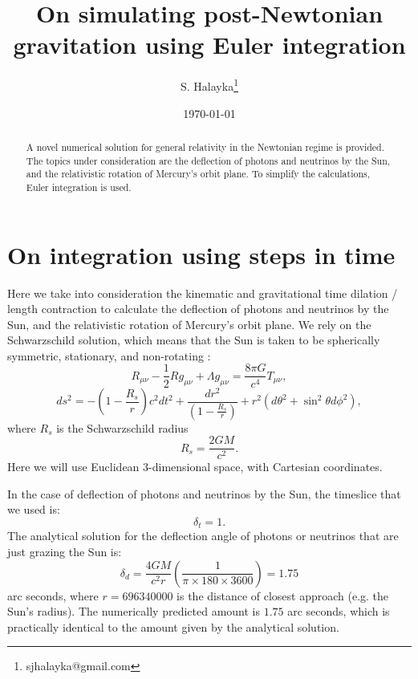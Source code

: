 \documentclass[12pt]{article}
\title{On simulating post-Newtonian gravitation using Euler integration}
\author{S. Halayka\footnote{sjhalayka@gmail.com}}
\date{\today\;\currenttime}
\begin{document}
 
\maketitle

\begin{abstract}
A novel numerical solution for general relativity in the Newtonian regime is provided.
The topics under consideration are the deflection of photons and neutrinos by the Sun, and the relativistic rotation of Mercury's orbit plane.
To simplify the calculations, Euler integration is used.
\end{abstract}





\section{On integration using steps in time}

Here we take into consideration the kinematic and gravitational time dilation / length contraction to calculate the deflection of photons and neutrinos by the Sun, and the relativistic rotation of Mercury's orbit plane.
We rely on the Schwarzschild solution, which means that the Sun is taken to be spherically symmetric, stationary, and non-rotating \cite{misner}:
\begin{equation}
R_{\mu\nu} - \frac{1}{2} R g_{\mu\nu} + \Lambda g_{\mu\nu} = \frac{8\pi G}{c^4} T_{\mu\nu},
\end{equation}
\begin{equation}
ds^2 = -\left( 1 - \frac{R_{s}}{r} \right) c^2 dt^2 + \frac{dr^2}{\left( 1 - \frac{R_{s}}{r} \right)} + r^2 (d\theta^2 + \sin^2 \theta d\phi^2),
\end{equation}
where $R_{s}$ is the Schwarzschild radius
\begin{equation}
R_{s} = \frac{2GM}{c^2}.
\end{equation}
Here we will use Euclidean 3-dimensional space, with Cartesian coordinates.

In the case of deflection of photons and neutrinos by the Sun, the timeslice that we used is:
\begin{equation}
\delta_{t} = 1.
\end{equation}
The analytical solution for the deflection angle of photons or neutrinos that are just grazing the Sun is:
\begin{equation}
\delta_{d} = \frac{4GM}{c^2 r} \left( \frac{1}{\pi \times 180 \times 3600} \right) = 1.75
\end{equation}
arc seconds, where $r = 696340000$ is the distance of closest approach (e.g. the Sun's radius).
The numerically predicted amount is $1.75$ arc seconds, which is practically identical to the amount given by the analytical solution.
\end{document}
